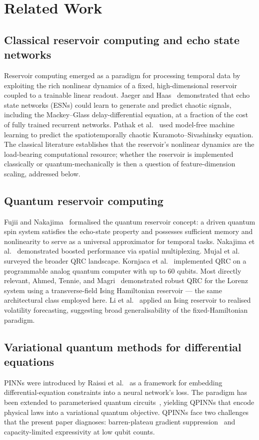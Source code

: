 \documentclass[a4paper,12pt]{iopart}
\begin{document}
\section{Related Work}

\subsection{Classical reservoir computing and echo state networks}
Reservoir computing emerged as a paradigm for processing temporal data
by exploiting the rich nonlinear dynamics of a fixed, high-dimensional
reservoir coupled to a trainable linear readout. Jaeger and
Haas~\cite{jaeger2004harnessing} demonstrated that echo state networks
(ESNs) could learn to generate and predict chaotic signals, including
the Mackey--Glass delay-differential equation, at a fraction of the
cost of fully trained recurrent networks. Pathak
et al.~\cite{pathak2018model} used model-free machine learning to
predict the spatiotemporally chaotic Kuramoto--Sivashinsky equation.
The classical literature establishes that the reservoir's nonlinear
dynamics are the load-bearing computational resource; whether the
reservoir is implemented classically or quantum-mechanically is then
a question of feature-dimension scaling, addressed below.

\subsection{Quantum reservoir computing}
Fujii and Nakajima~\cite{fujii2017} formalised the quantum reservoir
concept: a driven quantum spin system satisfies the echo-state property
and possesses sufficient memory and nonlinearity to serve as a
universal approximator for temporal tasks.
Nakajima et al.~\cite{nakajima2019boosting} demonstrated boosted
performance via spatial multiplexing.
Mujal et al.~\cite{mujal2021} surveyed the broader QRC landscape.
Kornjaca et al.~\cite{kornjaca2024largescale} implemented QRC on a
programmable analog quantum computer with up to 60 qubits.
Most directly relevant, Ahmed, Tennie, and Magri~\cite{ahmed2025robust}
demonstrated robust QRC for the Lorenz system using a transverse-field
Ising Hamiltonian reservoir --- the same architectural class employed
here.
Li et al.~\cite{li2025qrc} applied an Ising reservoir to realised
volatility forecasting, suggesting broad generalisability of the
fixed-Hamiltonian paradigm.

\subsection{Variational quantum methods for differential equations}
PINNs were introduced by Raissi et al.~\cite{raissi2019} as a framework
for embedding differential-equation constraints into a neural network's
loss. The paradigm has been extended to parameterised quantum
circuits~\cite{qcpinn2024,leung2022qpinn}, yielding QPINNs that encode
physical laws into a variational quantum objective. QPINNs face two
challenges that the present paper diagnoses: barren-plateau gradient
suppression~\cite{mcclean2018} and capacity-limited expressivity at
low qubit counts.
\end{document}
